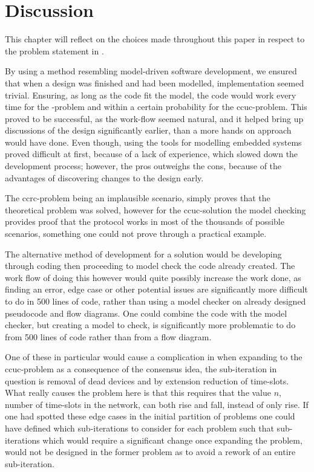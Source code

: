 \chapter{Discussion}\label{Discussion}
This chapter will reflect on the choices made throughout this paper in respect to the problem statement in .

\bigskip \noindent
By using a method resembling model-driven software development, we ensured that when a design was finished and had been modelled, implementation seemed trivial.
Ensuring, as long as the code fit the model, the code would work every time for the -problem and within a certain probability for the \gls{ccuc}-problem.
This proved to be successful, as the work-flow seemed natural, and it helped bring up discussions of the design significantly earlier, than a more hands on approach would have done.
Even though, using the tools for modelling embedded systems proved difficult at first, because of a lack of experience, which slowed down the development process; however, the pros outweighs the cons, because of the advantages of discovering changes to  the design early.

The \gls{ccrc}-problem being an implausible scenario, simply proves that the theoretical problem was solved, however for the \gls{ccuc}-solution the model checking provides proof that the protocol works in most of the thousands of possible scenarios, something one could not prove through a practical example.


The alternative method of development for a solution would be developing through coding then proceeding to model check the code already created.
The work flow of doing this however would quite possibly increase the work done, as finding an error, edge case or other potential issues are significantly more difficult to do in 500 lines of code, rather than using a model checker on already designed pseudocode and flow diagrams.
One could combine the code with the model checker, but creating a model to check, is significantly more problematic to do from 500 lines of code rather than from a flow diagram.

\bigskip \noindent
One of these in particular would cause a complication in when expanding to the \gls{ccuc}-problem as a consequence of the consensus idea, the sub-iteration in question is removal of dead devices and by extension reduction of time-slots.
What really causes the problem here is that this requires that the value $n$, number of time-slots in the network, can both rise and fall, instead of only rise.
If one had spotted these edge cases in the initial partition of problems one could have defined which sub-iterations to consider for each problem such that sub-iterations which would require a significant change once expanding the problem, would not be designed in the former problem as to avoid a rework of an entire sub-iteration.

